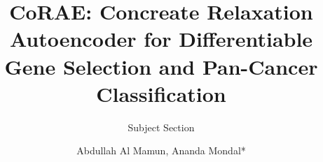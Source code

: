 \documentclass{bioinfo}
\begin{document}

\subtitle{Subject Section}

\title[short Title]{
CoRAE: Concreate Relaxation Autoencoder for Differentiable Gene Selection and Pan-Cancer Classification
}
\author[Sample \textit{et~al}.]{Abdullah Al Mamun, Ananda Mondal*}

\address{
School of Computing and Information Sciences \\
Florida International University, Miami, US
}



\end{document}
